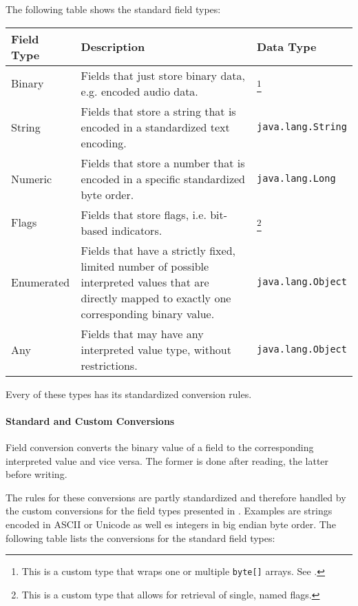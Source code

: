 The following table shows the standard field types:

\begin{longtable}{|p{}|p{}|p{}|}
	\hline
	Field Type & Description & Data Type \\
	\endhead
	\hline
	Binary & Fields that just store binary data, e.g. encoded audio data. & \CLASSbinaryValue{}\footnote{This is a custom type that wraps one or multiple \texttt{byte[]} arrays. See \SectionLink{sec:ReturningBinaryandInterpretedValue}.} \\
	\hline
	String & Fields that store a string that is encoded in a standardized text encoding. & \texttt{java.lang.String} \\
	\hline
	Numeric & Fields that store a number that is encoded in a specific standardized byte order. & \texttt{java.lang.Long} \\
	\hline
	Flags & Fields that store flags, i.e. bit-based indicators. & \CLASSFlags{}\footnote{This is a custom type that allows for retrieval of single, named flags.}\\
	\hline
	Enumerated & Fields that have a strictly fixed, limited number of possible interpreted values that are directly mapped to exactly one corresponding binary value. & \texttt{java.lang.Object} \\
	\hline
	Any & Fields that may have any interpreted value type, without restrictions. & \texttt{java.lang.Object} \\
	\hline
\end{longtable}

Every of these types has its standardized conversion rules.


\paragraph{Standard and Custom Conversions}
\label{sec:FieldConversion}

Field conversion converts the binary value of a field to the corresponding interpreted value and vice versa. The former is done after reading, the latter before writing.

The rules for these conversions are partly standardized and therefore handled by the custom conversions for the field types presented in . Examples are strings encoded in ASCII or Unicode as well es integers in big endian byte order. The following table lists the conversions for the standard field types:

